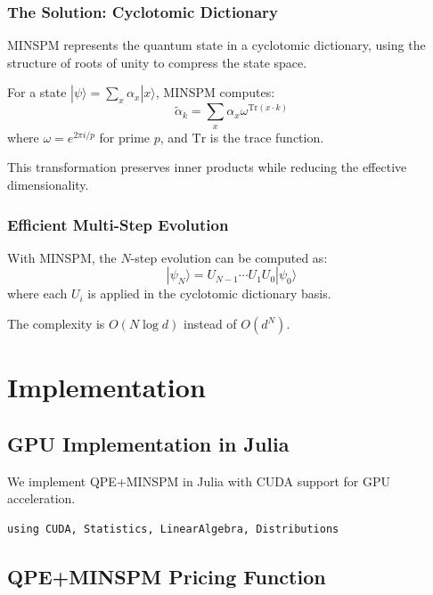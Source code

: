\documentclass[12pt]{article}
\begin{document}
\subsubsection{The Solution: Cyclotomic Dictionary}

MINSPM represents the quantum state in a cyclotomic dictionary, using the structure of roots of unity to compress the state space.

For a state $|\psi\rangle = \sum_{x} \alpha_x |x\rangle$, MINSPM computes:
\begin{equation}
    \tilde{\alpha}_k = \sum_{x} \alpha_x \omega^{\text{Tr}(x \cdot k)}
\end{equation}
where $\omega = e^{2\pi i / p}$ for prime $p$, and $\text{Tr}$ is the trace function.

This transformation preserves inner products while reducing the effective dimensionality.

\subsubsection{Efficient Multi-Step Evolution}

With MINSPM, the $N$-step evolution can be computed as:
\begin{equation}
    |\psi_N\rangle = U_{N-1} \cdots U_1 U_0 |\psi_0\rangle
\end{equation}
where each $U_i$ is applied in the cyclotomic dictionary basis.

The complexity is $O(N \log d)$ instead of $O(d^N)$.

\section{Implementation}

\subsection{GPU Implementation in Julia}

We implement QPE+MINSPM in Julia with CUDA support for GPU acceleration.

\begin{verbatim}
using CUDA, Statistics, LinearAlgebra, Distributions
\end{verbatim}

\subsection{QPE+MINSPM Pricing Function}
\end{document}
